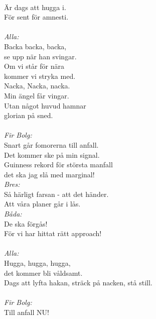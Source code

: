 \documentclass[a6paper, 10pt, twoside]{article}
\begin{document}
\begin{lyrics}
\vspace{-4pt}\\
Är dags att hugga i. \\
För sent för amnesti. \\
\vspace{-4pt}\\
\textit{Alla:}\\
Backa backa, backa, \\
se upp när han svingar. \\
Om vi står för nära \\
kommer vi stryka med. \\
Nacka, Nacka, nacka. \\
Min ängel får vingar. \\
Utan något huvud hamnar \\
glorian på sned. \\
\vspace{-4pt}\\
\textit{Fir Bolg:}\\
Snart går fomorerna till anfall.\\
Det kommer ske på min signal.\\
Guinness rekord för största manfall\\
det ska jag slå med marginal! \\
\textit{Bres:} \\
Så härligt farsan - att det händer. \\
Att våra planer går i lås. \\
\textit{Båda:} \\
De ska förgås! \\
För vi har hittat rätt approach! \\
\vspace{-4pt}\\
\textit{Alla:} \\
Hugga, hugga, hugga, \\
det kommer bli våldsamt.\\
Dags att lyfta hakan, 
sträck på nacken, stå still. \\
\vspace{-4pt}\\
\textit{Fir Bolg:} \\
Till anfall NU! 

\end{lyrics}

\end{document}
